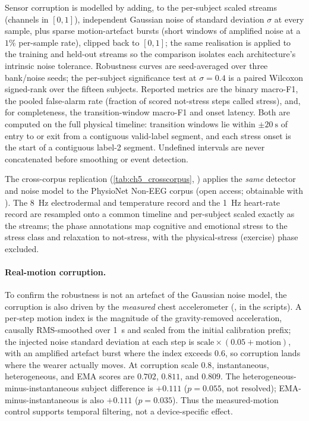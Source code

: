 Sensor corruption is modelled by adding, to the per-subject scaled streams
(channels in $[0,1]$), independent Gaussian noise of standard deviation $\sigma$ at
every sample, plus sparse motion-artefact bursts (short windows of amplified noise at
a $1\%$ per-sample rate), clipped back to $[0,1]$; the same realisation is applied to
the training and held-out streams so the comparison isolates each architecture's
intrinsic noise tolerance. Robustness curves are seed-averaged over three bank/noise
seeds; the per-subject significance test at $\sigma=0.4$ is a paired Wilcoxon
signed-rank over the fifteen subjects. Reported metrics are the binary macro-F1, the
pooled false-alarm rate (fraction of scored not-stress steps called stress), and,
for completeness, the transition-window macro-F1 and onset latency. Both are
computed on the full physical timeline: transition windows lie within
$\pm\SI{20}{\second}$ of entry to or exit from a contiguous valid-label segment,
and each stress onset is the start of a contiguous label-2 segment. Undefined
intervals are never concatenated before smoothing or event detection.

The cross-corpus replication (\cref{tab:ch5_crosscorpus}, )
applies the \emph{same} detector and noise model to the PhysioNet Non-EEG corpus
\cite{Birjandtalab2016} (open access; obtainable with
). The \SI{8}{\hertz} electrodermal
and temperature record and the \SI{1}{\hertz} heart-rate record are resampled onto a
common timeline and per-subject scaled exactly as the \WESAD{} streams; the phase
annotations map cognitive and emotional stress to the stress class and relaxation to
not-stress, with the physical-stress (exercise) phase excluded.

\paragraph{Real-motion corruption.} To confirm the robustness is not an artefact of the
Gaussian noise model, the corruption is also driven by the \emph{measured} chest
accelerometer (,  in the scripts). A per-step
motion index is the magnitude of the gravity-removed acceleration, causally
RMS-smoothed over \SI{1}{\second} and scaled from the initial calibration prefix; the injected noise standard
deviation at each step is $\text{scale}\times(0.05 + \text{motion})$, with an amplified
artefact burst where the index exceeds $0.6$, so corruption lands where the wearer
actually moves. At corruption scale $0.8$, instantaneous, heterogeneous, and EMA
scores are $0.702$, $0.811$, and $0.809$. The heterogeneous-minus-instantaneous
subject difference is $+0.111$ ($p=0.055$, not resolved); EMA-minus-instantaneous is
also $+0.111$ ($p=0.035$). Thus the measured-motion control supports temporal
filtering, not a device-specific effect.

